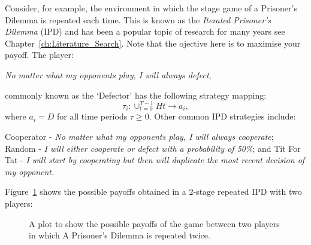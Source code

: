 Consider, for example, the environment in which the stage game of a Prisoner's
Dilemma is repeated each time. This is known as the \emph{Iterated Prisoner's
Dilemma} (IPD) and has been a popular topic of research for many years see
Chapter~\ref{ch:Literature_Search}. Note that the ojective here is to maximise
your payoff. The player: 
\begin{center}
    \textit{No matter what my opponents play, I will always defect},
\end{center}
commonly known as the `Defector' has the following strategy mapping:
\[
    \tau_{i} : \cup_{t = 0}^{T-1}{H{t}} \to a_{i},
\]
where \(a_{i}=D\) for all time periods \(\tau \ge 0\). Other common IPD
strategies include: 
\begin{center}
    Cooperator - \textit{No matter what my opponents play, I will always
    cooperate};
    Random - \textit{I will either cooperate or defect with a probability of
    50\%}; and
    \newline Tit For Tat - \textit{I will start by cooperating but then will 
    duplicate the most recent decision of my opponent.}
\end{center}

Figure~\ref{fig:2-stage_payoff_plot} shows the possible payoffs obtained in a 
2-stage repeated IPD with two players:

\begin{figure}
    \caption{A plot to show the possible payoffs of the game between two players in which A Prisoner's Dilemma is repeated twice.}\label{fig:2-stage_payoff_plot}
\end{figure}


